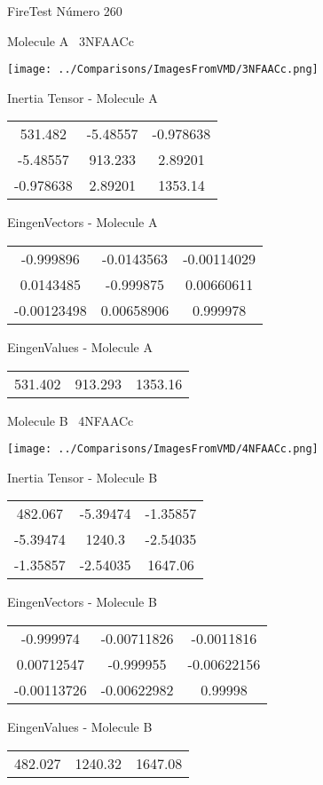 \vtab[-3cm]
\begin{center}
{\large FireTest \tab Número 260}
\end{center}
\begin{multicols}{2}
\begin{center}

Molecule A \
3NFAACc

\texttt{[image: ../Comparisons/ImagesFromVMD/3NFAACc.png]}

Inertia Tensor - Molecule A \\
\begin{tabular}{|c c c|}
531.482	 & 	-5.48557	 & 	-0.978638	 \\
-5.48557	 & 	913.233	 & 	2.89201	 \\
-0.978638	 & 	2.89201	 & 	1353.14
\end{tabular}

\vtab
 EingenVectors - Molecule A     \\
\begin{tabular}{|c c c|}
-0.999896	 & 	-0.0143563	 & 	-0.00114029	 \\
0.0143485	 & 	-0.999875	 & 	0.00660611	 \\
-0.00123498	 & 	0.00658906	 & 	0.999978
\end{tabular}

\vtab
 EingenValues - Molecule A     \\
\begin{tabular}{|c c c|}
531.402	 & 	913.293	 & 	1353.16	 \\
\end{tabular}
\columnbreak

Molecule B \
4NFAACc

\texttt{[image: ../Comparisons/ImagesFromVMD/4NFAACc.png]}

Inertia Tensor - Molecule B \\
\begin{tabular}{|c c c|}
482.067	 & 	-5.39474	 & 	-1.35857	 \\
-5.39474	 & 	1240.3	 & 	-2.54035	 \\
-1.35857	 & 	-2.54035	 & 	1647.06
\end{tabular}

\vtab
 EingenVectors - Molecule B     \\
\begin{tabular}{|c c c|}
-0.999974	 & 	-0.00711826	 & 	-0.0011816	 \\
0.00712547	 & 	-0.999955	 & 	-0.00622156	 \\
-0.00113726	 & 	-0.00622982	 & 	0.99998
\end{tabular}

\vtab
 EingenValues - Molecule B     \\
\begin{tabular}{|c c c|}
482.027	 & 	1240.32	 & 	1647.08	 \\
\end{tabular}

\end{center}
\end{multicols}

